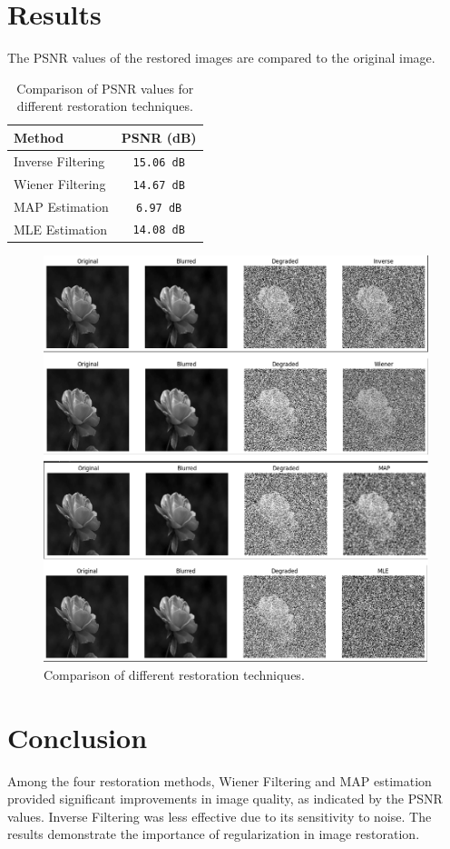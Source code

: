 \documentclass{report}
\begin{document}
\section{Results}
The PSNR values of the restored images are compared to the original image.

\begin{table}[h]
    \centering
    \begin{tabular}{l c}
        \toprule
        \textbf{Method} & \textbf{PSNR (dB)} \\
        \midrule
        Inverse Filtering &  \texttt{15.06 dB} \\
        Wiener Filtering  &  \texttt{14.67 dB} \\
        MAP Estimation    &  \texttt{6.97 dB} \\
        MLE Estimation    &  \texttt{14.08 dB} \\
        \bottomrule
    \end{tabular}
    \caption{Comparison of PSNR values for different restoration techniques.}
    \label{tab:psnr}
\end{table}

\begin{figure}[h]
    \centering
    \includegraphics[width=\textwidth]{images/Exp-10-Results.png}
    \caption{Comparison of different restoration techniques.}
    \label{fig:results}
\end{figure}

\section{Conclusion}
Among the four restoration methods, Wiener Filtering and MAP estimation provided significant improvements in image quality, as indicated by the PSNR values. Inverse Filtering was less effective due to its sensitivity to noise. The results demonstrate the importance of regularization in image restoration.
\end{document}

